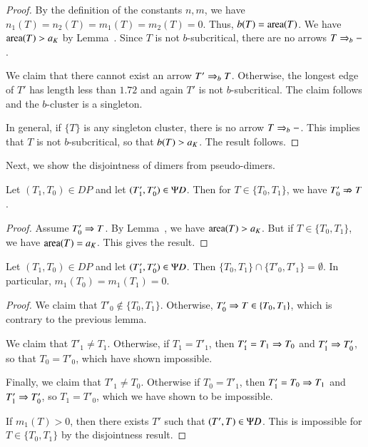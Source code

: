 \begin{proof}  By the definition of the constants $n,m$, we have $n_1(T)=n_2(T) = m_1(T)=m_2(T)=0$.
Thus, $b(T)={\operatorname{area}}(T)$.  We have ${\operatorname{area}}(T) > a_K$ by Lemma~.  Since $T$ is not $b$-subcritical,
there are no arrows $T\Rightarrow_{b} -$.  

We claim that there cannot exist an arrow $T'\Rightarrow_{b} T$.
Otherwise,  the longest edge of $T'$ has length less than $1.72$
and again $T'$ is not $b$-subcritical.  The claim follows and the $b$-cluster is a singleton.

In general, if $\{T\}$ is any singleton cluster, there is no arrow $T\Rightarrow_{b} -$.  This implies that $T$ is not
$b$-subcritical, so that $b(T) > a_K$.  The result follows.
\end{proof}

Next,
we show the disjointness of dimers from pseudo-dimers.  

\begin{lemma} Let $(T_1,T_0)\in DP$ and let $(T'_1,T'_0)\in\Psi D$.  Then for $T\in\{T_0,T_1\}$,
we have
$T'_0\nRightarrow T$.
\end{lemma}

\begin{proof} Assume  $T'_0\Rightarrow T$.  By Lemma~,
we have ${\operatorname{area}}(T)>a_K$.  But if $T\in\{T_0,T_1\}$, we have ${\operatorname{area}}(T)=a_K$.
This gives the result.
\end{proof}

\begin{lemma}\label{lemma:m1-dimer}  Let $(T_1,T_0)\in DP$ and let $(T'_1,T'_0)\in\Psi D$.  Then
$\{T_0,T_1\}\cap \{T'_0,T'_1\} = \emptyset$.  In particular, $m_1(T_0) = m_1(T_1)=0$.
\end{lemma}

\begin{proof}
We claim that $T'_0\not\in \{T_0,T_1\}$.  Otherwise, $T'_0\Rightarrow T\in\{T_0,T_1\}$, which is contrary
to the previous lemma.

We claim that $T'_1\ne T_1$.  Otherwise, if $T_1=T'_1$, then $T'_1=T_1\Rightarrow T_0$ and $T'_1\Rightarrow T'_0$,
so that $T_0 = T'_0$, which have shown impossible.

Finally, we claim that $T'_1\ne T_0$.  Otherwise if $T_0 = T'_1$, then $T'_1 = T_0\Rightarrow T_1$ and
$T'_1\Rightarrow T'_0$, so $T_1 = T'_0$, which we have shown to be impossible.

If $m_1(T) >0$, then there exists $T'$ such that $(T',T)\in \Psi D$.  This is impossible for $T\in\{T_0,T_1\}$ by the
disjointness result.
\end{proof}

